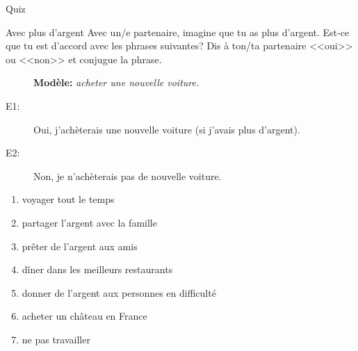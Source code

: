 \documentclass{beamer}
\begin{document}
  \begin{frame}{}
    \begin{center}
      \Large Quiz
    \end{center}
  \end{frame}

  \begin{frame}{Avec plus d'argent}
    Avec un/e partenaire, imagine que tu as plus d'argent.
    Est-ce que tu est d'accord avec les phrases suivantes?
    Dis à ton/ta partenaire <<oui>> ou <<non>> et conjugue la phrase.
    \begin{description}
      \item[] \textbf{Modèle:} \emph{acheter une nouvelle voiture.}
      \item[E1:] Oui, j'achèterais une nouvelle voiture (si j'avais plus d'argent).
      \item[E2:] Non, je n'achèterais pas de nouvelle voiture.
    \end{description}
    \begin{enumerate}
      \item voyager tout le temps
      \item partager l'argent avec la famille
      \item prêter de l'argent aux amis
      \item dîner dans les meilleurs restaurants
      \item donner de l'argent aux personnes en difficulté
      \item acheter un château en France
      \item ne pas travailler
    \end{enumerate}
  \end{frame}
\end{document}
